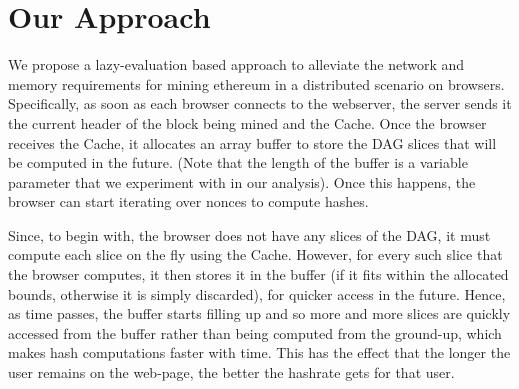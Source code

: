 \documentclass[runningheads]{llncs}
\begin{document}
\section{Our Approach}
We propose a lazy-evaluation based approach to alleviate the network and memory requirements for mining ethereum in a distributed scenario on browsers. Specifically, as soon as each browser connects to the webserver, the server sends it the current header of the block being mined and the Cache. Once the browser receives the Cache, it allocates an array buffer to store the DAG slices that will be computed in the future. (Note that the length of the buffer is a variable parameter that we experiment with in our analysis). Once this happens, the browser can start iterating over nonces to compute hashes.  

Since, to begin with, the browser does not have any slices of the DAG, it must compute each slice on the fly using the Cache. However, for every such slice that the browser computes, it then stores it in the buffer (if it fits within the allocated bounds, otherwise it is simply discarded), for quicker access in the future. Hence, as time passes, the buffer starts filling up and so more and more slices are quickly accessed from the buffer rather than being computed from the ground-up, which makes hash computations faster with time. This has the effect that the longer the user remains on the web-page, the better the hashrate gets for that user. 
\end{document}
